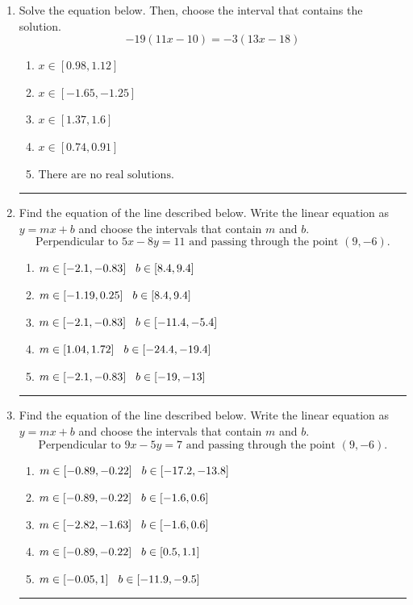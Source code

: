 \documentclass[14pt]{extbook}
\newcommand{\litem}[1]{\item#1\hspace*{-1cm}\rule{\textwidth}{0.4pt}}
\begin{document}
\begin{enumerate}
\litem{
Solve the equation below. Then, choose the interval that contains the solution.\[ -19(11x -10) = -3(13x -18) \]\begin{enumerate}[label=\Alph*.]
\item \( x \in [0.98, 1.12] \)
\item \( x \in [-1.65, -1.25] \)
\item \( x \in [1.37, 1.6] \)
\item \( x \in [0.74, 0.91] \)
\item \( \text{There are no real solutions.} \)

\end{enumerate} }
\litem{
Find the equation of the line described below. Write the linear equation as $ y=mx+b $ and choose the intervals that contain $m$ and $b$.\[ \text{Perpendicular to } 5 x - 8 y = 11 \text{ and passing through the point } (9, -6). \]\begin{enumerate}[label=\Alph*.]
\item \( m \in [-2.1, -0.83] \hspace*{3mm} b \in [8.4, 9.4] \)
\item \( m \in [-1.19, 0.25] \hspace*{3mm} b \in [8.4, 9.4] \)
\item \( m \in [-2.1, -0.83] \hspace*{3mm} b \in [-11.4, -5.4] \)
\item \( m \in [1.04, 1.72] \hspace*{3mm} b \in [-24.4, -19.4] \)
\item \( m \in [-2.1, -0.83] \hspace*{3mm} b \in [-19, -13] \)

\end{enumerate} }
\litem{
Find the equation of the line described below. Write the linear equation as $ y=mx+b $ and choose the intervals that contain $m$ and $b$.\[ \text{Perpendicular to } 9 x - 5 y = 7 \text{ and passing through the point } (9, -6). \]\begin{enumerate}[label=\Alph*.]
\item \( m \in [-0.89, -0.22] \hspace*{3mm} b \in [-17.2, -13.8] \)
\item \( m \in [-0.89, -0.22] \hspace*{3mm} b \in [-1.6, 0.6] \)
\item \( m \in [-2.82, -1.63] \hspace*{3mm} b \in [-1.6, 0.6] \)
\item \( m \in [-0.89, -0.22] \hspace*{3mm} b \in [0.5, 1.1] \)
\item \( m \in [-0.05, 1] \hspace*{3mm} b \in [-11.9, -9.5] \)


\end{enumerate}}
\end{enumerate}
\end{document}
